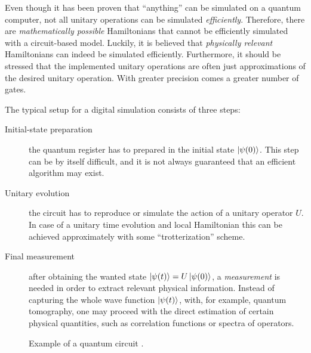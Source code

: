 Even though it has been proven \cite{lloyd1996simulator} that ``anything'' can be simulated on a quantum computer, not all unitary operations can be simulated \emph{efficiently}.
Therefore, there are \emph{mathematically possible} Hamiltonians that cannot be efficiently simulated with a circuit-based model.
Luckily, it is believed that \emph{physically relevant} Hamiltonians can indeed be simulated efficiently\citneeded.
Furthermore, it should be stressed that the implemented unitary operations are often just approximations of the desired unitary operation.
With greater precision comes a greater number of gates.

The typical setup for a digital simulation consists of three steps:
\begin{description}
    \item[Initial-state preparation] the quantum register has to prepared in the initial state $\ket{\psi(0)}$.
        This step can be by itself difficult, and it is not always guaranteed that an efficient algorithm may exist.

    \item[Unitary evolution]  the circuit has to reproduce or simulate the action of a unitary operator $U$.
        In case of a unitary time evolution and local Hamiltonian this can be achieved approximately with some ``trotterization'' scheme.

    \item[Final measurement] after obtaining the wanted state $\ket{\psi(t)} = U \ket{\psi(0)}$, a \emph{measurement} is needed in order to extract relevant physical information.
        Instead of capturing the whole wave function $\ket{\psi(t)}$, with, for example, quantum tomography, one may proceed with the direct estimation of certain physical quantities, such as correlation functions or spectra of operators.
\end{description}



\begin{figure}[t]
    \centering
    \newcommand{\Gate}[3]{\draw[gate] (#1, -#2 + 0.25) rectangle ++(1.5, -#3 - 0.5);}
    \caption{Example of a quantum circuit .}
\end{figure}


